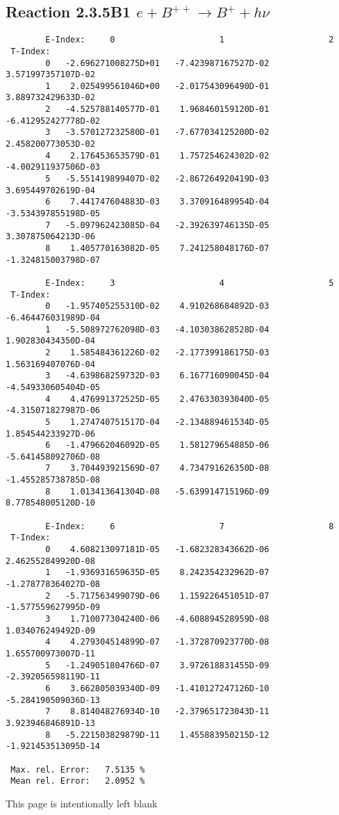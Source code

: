 \subsection{
Reaction 2.3.5B1  $e + B^{++} \rightarrow B^+ + h\nu$
}

\begin{verbatim}
        E-Index:     0                     1                     2
 T-Index:
        0   -2.696271008275D+01   -7.423987167527D-02    3.571997357107D-02
        1    2.025499561046D+00   -2.017543096490D-01    3.889732429633D-02
        2   -4.525788140577D-01    1.968460159120D-01   -6.412952427778D-02
        3   -3.570127232580D-01   -7.677034125200D-02    2.458200773053D-02
        4    2.176453653579D-01    1.757254624302D-02   -4.002911937506D-03
        5   -5.551419899407D-02   -2.867264920419D-03    3.695449702619D-04
        6    7.441747604883D-03    3.370916489954D-04   -3.534397855198D-05
        7   -5.097962423085D-04   -2.392639746135D-05    3.307875064213D-06
        8    1.405770163082D-05    7.241258048176D-07   -1.324815003798D-07

        E-Index:     3                     4                     5
 T-Index:
        0   -1.957405255310D-02    4.910268684892D-03   -6.464476031989D-04
        1   -5.508972762098D-03   -4.103038628528D-04    1.902830434350D-04
        2    1.585484361226D-02   -2.177399186175D-03    1.563169407076D-04
        3   -4.639868259732D-03    6.167716090045D-04   -4.549330605404D-05
        4    4.476991372525D-05    2.476330393040D-05   -4.315071827987D-06
        5    1.274740751517D-04   -2.134889461534D-05    1.854544233927D-06
        6   -1.479662046092D-05    1.581279654885D-06   -5.641458092706D-08
        7    3.704493921569D-07    4.734791626350D-08   -1.455285738785D-08
        8    1.013413641304D-08   -5.639914715196D-09    8.778548005120D-10

        E-Index:     6                     7                     8
 T-Index:
        0    4.608213097181D-05   -1.682328343662D-06    2.462552849920D-08
        1   -1.936931659635D-05    8.242354232962D-07   -1.278778364027D-08
        2   -5.717563499079D-06    1.159226451051D-07   -1.577559627995D-09
        3    1.710077304240D-06   -4.608894528959D-08    1.034076249492D-09
        4    4.279304514899D-07   -1.372870923770D-08    1.655700973007D-11
        5   -1.249051804766D-07    3.972618831455D-09   -2.392056598119D-11
        6    3.662805039340D-09   -1.410127247126D-10   -5.284190509036D-13
        7    8.814048276934D-10   -2.379651723043D-11    3.923946846891D-13
        8   -5.221503829879D-11    1.455883950215D-12   -1.921453513095D-14

 Max. rel. Error:   7.5135 %
 Mean rel. Error:   2.0952 %

\end{verbatim}
\newpage
This page is intentionally left blank
\newpage
